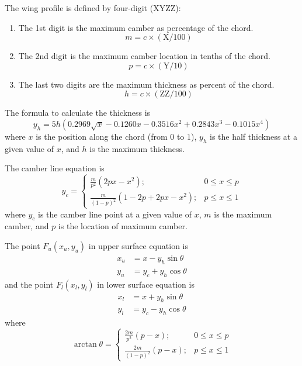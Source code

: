 \documentclass{turgon}
\begin{document}
The wing profile is defined by four-digit ($\mathrm{XYZZ}$):
\begin{enumerate}
    \item
    The 1st digit is the maximum camber as percentage of the chord.
    \begin{equation*}
        m = c \times (\mathrm{X}/100)
    \end{equation*}
    \item
    The 2nd digit is the maximum camber location in tenths of the chord.
    \begin{equation*}
        p = c \times (\mathrm{Y}/10)
    \end{equation*}
    \item
    The last two digits are the maximum thickness as percent of the chord.
    \begin{equation*}
        h = c \times (\mathrm{ZZ}/100)
    \end{equation*}
\end{enumerate}

The formula to calculate the thickness is
\begin{equation*}
    y_h = 5h\left(0.2969\sqrt{x}-0.1260x-0.3516x^2+0.2843x^3-0.1015x^4\right)
\end{equation*}
where $x$ is the position along the chord (from $0$ to $1$), $y_h$ is the
half thickness at a given value of $x$, and $h$ is the maximum thickness.

The camber line equation is
\begin{equation*}
    y_c =
    \begin{cases}
    \frac{m}{p^2} (2px - x^2); & 0 \leq x \leq p \\
    \frac{m}{(1-p)^2} (1 - 2p + 2px - x^2);  &  p \leq x \leq 1
    \end{cases}
\end{equation*}
where $y_c$ is the camber line point at a given value of $x$, $m$ is the
maximum camber, and $p$ is the location of maximum camber.

The point $F_u(x_u, y_u)$ in upper surface equation is
\begin{align}
    x_u &= x - y_h \sin\theta
    \label{e:naca:up_x}
    \\
    y_u &= y_c + y_h \cos\theta
    \label{e:naca:up_y}
\end{align}
and the point $F_l(x_l, y_l)$ in lower surface equation is
\begin{align*}
    x_l &= x + y_h \sin\theta
    \\
    y_l &= y_c - y_h \cos\theta
\end{align*}
where
\begin{equation*}
    \arctan \theta =
    \begin{cases}
    \frac{2m}{p^2} (p - x); & 0 \leq x \leq p \\
    \frac{2m}{(1-p)^2} (p - x);  &  p \leq x \leq 1
    \end{cases}
\end{equation*}
\end{document}
